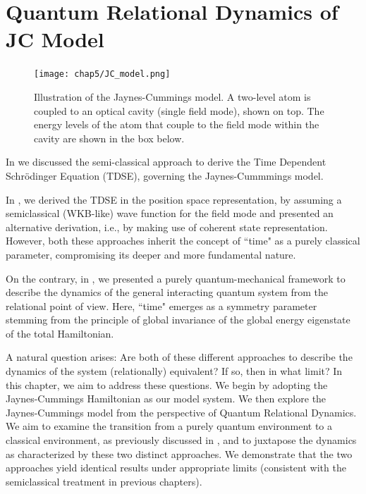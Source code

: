 \chapter{Quantum Relational Dynamics of JC Model
\label{chap5:RDQ_JCM_chap}}


\begin{figure}[!ht]
    \centering
    \texttt{[image: chap5/JC\_model.png]}
    \caption{Illustration of the Jaynes-Cummings model. A two-level atom is coupled to an optical cavity (single field mode), shown on top. The energy levels of the atom that couple to the field mode within the cavity are shown in the box below.}
    \label{fig:JC_illusttration}
\end{figure}

\noindent
In  we discussed the semi-classical approach to derive the Time Dependent Schr\"odinger Equation (TDSE), governing the Jaynes-Cummmings model. 

\newpage

In , we derived the TDSE in the position space representation, by assuming a semiclassical (WKB-like) wave function for the field mode and  presented an alternative derivation, i.e., by making use of coherent state representation.
However,  both these approaches inherit the concept of ``time" as a purely classical parameter, compromising its deeper and more fundamental nature.

On the contrary, in , we presented a purely quantum-mechanical framework to describe the dynamics of the general interacting quantum system from the relational point of view. Here, ``time" emerges as a symmetry parameter stemming from the principle of global invariance of the global energy eigenstate of the total Hamiltonian.

A natural question arises: Are both of these different approaches to describe the dynamics of the system (relationally) equivalent? If so, then in what limit? In this chapter, we aim to address these questions. We begin by adopting the Jaynes-Cummings Hamiltonian as our model system. We then explore the Jaynes-Cummings model from the perspective of Quantum Relational Dynamics. We aim to examine the transition from a purely quantum environment to a classical environment, as previously discussed in , and to juxtapose the dynamics as characterized by these two distinct approaches. We demonstrate that the two approaches yield identical results under appropriate limits (consistent with the semiclassical treatment in previous chapters). 


